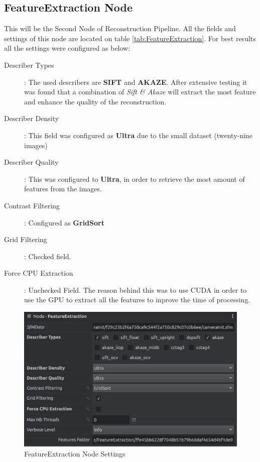 \documentclass[12pt]{report}
\begin{document}
\subsection*{FeatureExtraction Node}
This will be the Second Node of Reconstruction Pipeline. All the fields and settings of this node are located on table \ref{tab:FeatureExtraction}.
For best results all the settings were configured as below:

\begin{description}
  \item[Describer Types]: The used describers are \textbf{SIFT} and \textbf{AKAZE}. After extensive testing it was found that a combination of \textit{Sift \& Akaze} will extract the most feature and enhance the quality of the reconstruction.
  \item[Describer Density] : This field was configured as \textbf{Ultra} due to the small dataset (twenty-nine images)
  \item[Describer Quality] : This was configured to \textbf{Ultra}, in order to retrieve the most amount of features from the images.
  \item[Contrast Filtering]: Configured as \textbf{GridSort}
  \item[Grid Filtering]  : Checked field.
  \item[Force CPU Extraction] : Unchecked Field. The reason behind this was to use CUDA in order to use the GPU to extract all the features to inprove the time of processing.
\end{description}


\begin{figure}[H]%
  \centering
 \includegraphics[width=1\textwidth]{FeatureExtractionNode.png}
\caption{FeatureExtraction Node Settings}
\label{fig:feature_extraction_node} 
\end{figure}
\end{document}
